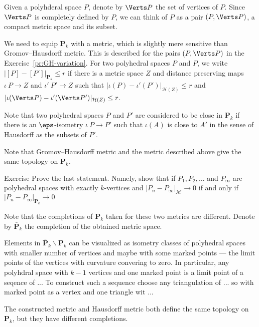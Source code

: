 Given a polyhderal space $P$, 
denote by $\Verts P$ the set of vertices of  $P$.
Since $\Verts P$ is completely defined by $P$,
we can think of $P$ as a pair $(P,\Verts P)$, a compact metric space and its subset.

We need to equip $\mathbf{P}_k$ with a metric,
which is slightly mere sensitive than Gromov--Hausdorff metric.
This is described for the pairs $(P,\Verts P)$ in the Exercise~\ref{pr:GH-variation}.
For two polyhedral spaces $P$ and $P$,
we write $|[P]-[P']|_{\mathbf{P}_k}\le r$
if there is a metric  space $Z$ 
and distance preserving maps
$\iota\:P\to Z$ and $\iota'\:P'\to Z$
such that $|\iota(P)-\iota'(P')|_{\mathcal{H}(Z)}\le r$
and $|\iota(\Verts P)-\iota'(\Verts P')|_{\mathcal{H}(Z)}\le r$.

Note that two polyhedral spaces $P$ and $P'$ are considered to be close in $\mathbf{P}_k$
if there is an $\eps$-isometry $\iota\: P\to P'$
such that $\iota(A)$ is close to $A'$ in the sense of Hausdorff
as the subsets of $P'$.

Note that Gromov--Hausdorff metric and the metric described above 
give the same topology on $\mathbf{P}_k$.

\begin{thm}{Exercise}
Prove the last statement.
Namely, show that if $P_1,P_2,\dots$ and $P_\infty$ 
are polyhedral spaces with
exactly $k$-vertices
and 
$|P_n-P_\infty|_\mathcal{M}\to 0$ 
if and only if
$|P_n-P_\infty|_{\mathbf{P}_k}\to 0$
\end{thm}

Note that the completions of $\mathbf{P}_k$ 
taken for these two metrics are different.
Denote by $\bar{\mathbf{P}}_k$ the completion of the obtained metric space.









Elements in $\bar{\mathbf{P}}_k\backslash \mathbf{P}_k$
can be visualized as isometry classes of polyhedral spaces with 
smaller number of vertices and maybe with some marked points --- the limit points of the vertices with curvature convering to zero.
In particular, any polyhdral space with $k-1$ vertices
and one marked point is a limit point of a seqence of ...
To construct such a sequence choose any triangulation of ...
so with marked point as a vertex and one triangle wit ... 

The constructed metric
and Hausdorff metric
both define the same topology on $\mathbf{P}_k$,
but they have different completions.

